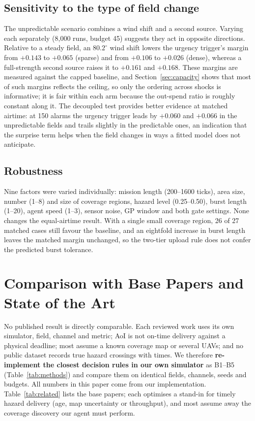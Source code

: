 \documentclass[pdflatex,sn-mathphys-num,iicol]{sn-jnl}
\theoremstyle{thmstyleone}
\theoremstyle{thmstyletwo}
\theoremstyle{thmstylethree}
\begin{document}
\subsection{Sensitivity to the type of field change}\label{sec:attribution}

The unpredictable scenario combines a wind shift and a second source. Varying each
separately (8{,}000 runs, budget 45) suggests they act in opposite directions. Relative to a
steady field, an $80.2^\circ$ wind shift lowers the urgency trigger's margin from $+0.143$ to
$+0.065$ (sparse) and from $+0.106$ to $+0.026$ (dense), whereas a full-strength second
source raises it to $+0.161$ and $+0.168$. These margins are measured against the capped
baseline, and Section~\ref{sec:capacity} shows that most of such margins reflects the
ceiling, so only the ordering across shocks is informative; it is fair within each arm
because the out-spend ratio is roughly constant along it. The decoupled test provides
better evidence at matched airtime: at 150 alarms the urgency trigger leads by $+0.060$ and
$+0.066$ in the unpredictable fields and trails slightly in the predictable ones, an
indication that the surprise term helps when the field changes in ways a fitted model does
not anticipate.

\subsection{Robustness}

Nine factors were varied individually: mission length (200--1600 ticks), area size,
number (1--8) and size of coverage regions, hazard level (0.25--0.50), burst length
(1--20), agent speed (1--3), sensor noise, GP window and both gate settings. None changes
the equal-airtime result. With a single small coverage region, 26 of 27 matched cases
still favour the baseline, and an eightfold increase in burst length leaves the matched
margin unchanged, so the two-tier upload rule does not confer the predicted burst
tolerance.

\section{Comparison with Base Papers and State of the Art}\label{sec:basecmp}

No published result is directly comparable. Each reviewed work uses its own
simulator, field, channel and metric; AoI is not on-time delivery against a physical
deadline; most assume a known coverage map or several UAVs; and no public dataset
records true hazard crossings with times. We therefore \textbf{re-implement the closest
decision rules in our own simulator} as B1--B5 (Table~\ref{tab:methods}) and compare them
on identical fields, channels, seeds and budgets. All numbers in this paper come from our
implementation. Table~\ref{tab:related} lists the base papers; each optimises a stand-in
for timely hazard delivery (age, map uncertainty or throughput), and most assume away the
coverage discovery our agent must perform.
\end{document}
